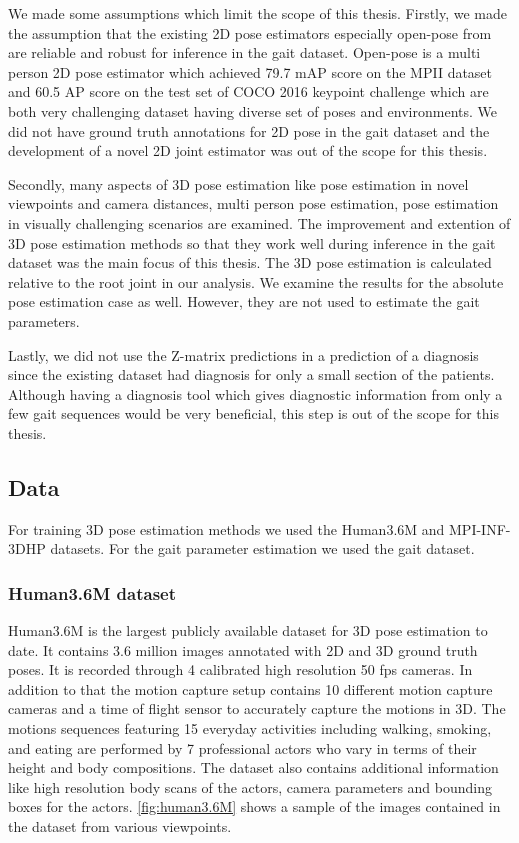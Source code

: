 We made some assumptions which limit the scope of this thesis. Firstly, we made the assumption that the existing 2D pose estimators especially open-pose from \parencite{cao2016realtime} are reliable and robust for inference in the gait dataset. Open-pose is a multi person 2D pose estimator which achieved 79.7 mAP score on the MPII dataset and 60.5 AP score on the test set of COCO 2016 keypoint challenge which are both very challenging dataset having diverse set of poses and environments. We did not have ground truth annotations for 2D pose in the gait dataset and the development of a novel 2D joint estimator was out of the scope for this thesis.

Secondly, many aspects of 3D pose estimation like pose estimation in novel viewpoints and camera distances, multi person pose estimation, pose estimation in visually challenging scenarios are examined. The improvement and extention of 3D pose estimation methods so that they work well during inference in the gait dataset was the main focus of this thesis. The 3D pose estimation is calculated relative to the root joint in our analysis. We examine the results for the absolute pose estimation case as well. However, they are not used to estimate the gait parameters.

Lastly, we did not use the Z-matrix predictions in a prediction of a diagnosis since the existing dataset had diagnosis for only a small section of the patients. Although having a diagnosis tool which gives diagnostic information from only a few gait sequences would be very beneficial, this step is out of the scope for this thesis.

\subsection{Data}

For training 3D pose estimation methods we used the Human3.6M \parencite{ionescu2014human3} and MPI-INF-3DHP \parencite{mehta2017monocular} datasets. For the gait parameter estimation we used the gait dataset.

\subsubsection{Human3.6M dataset}

Human3.6M is the largest publicly available dataset for 3D pose estimation to date. It contains 3.6 million images annotated with 2D and 3D ground truth poses. It is recorded through 4 calibrated high resolution 50 fps cameras. In addition to that the motion capture setup contains 10 different motion capture cameras and a time of flight sensor to accurately capture the motions in 3D. The motions sequences featuring 15 everyday activities including walking, smoking, and eating are performed by 7 professional actors who vary in terms of their height and body compositions. The dataset also contains additional information like high resolution body scans of the actors, camera parameters and bounding boxes for the actors. \autoref{fig:human3.6M} shows a sample of the images contained in the dataset from various viewpoints.

